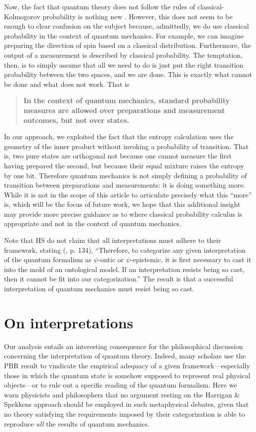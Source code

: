 \documentclass[10pt,twocolumn, nofootinbib]{revtex4-2}
\begin{document}
Now, the fact that quantum theory does not follow the rules of classical-Kolmogorov probability is nothing new \cite{Werner:2014, Pitowsky:1989}. However, this does not seem to be enough to clear confusion on the subject because, admittedly, we do use classical probability in the context of quantum mechanics. For example, we can imagine preparing the direction of spin based on a classical distribution. Furthermore, the output of a measurement is described by classical probability. The temptation, then, is to simply assume that all we need to do is just put the right transition probability between the two spaces, and we are done. This is exactly what cannot be done and what does not work. That is
\begin{quote}
	\textbf{In the context of quantum mechanics, standard probability measures are allowed over preparations and measurement outcomes, but not over states.}
\end{quote}
In our approach, we exploited the fact that the entropy calculation uses the geometry of the inner product without invoking a probability of transition. That is, two pure states are orthogonal not because one cannot measure the first having prepared the second, but because their equal mixture raises the entropy by one bit. Therefore quantum mechanics is not simply defining a probability of transition between preparations and measurements: it is doing something more. While it is not in the scope of this article to articulate precisely what this ``more'' is, which will be the focus of future work, we hope that this additional insight may provide more precise guidance as to where classical probability calculus is appropriate and not in the context of quantum mechanics.

Note that HS do not claim that all interpretations must adhere to their framework, stating (\cite{Harrigan:2010}, p. 134), ``Therefore, to categorize any given interpretation of the quantum formalism as $\psi$-ontic or $\psi$-epistemic, it is first necessary to cast it into the mold of an ontological model. If an interpretation resists being so cast, then it cannot be fit into our categorization.'' The result is that a successful interpretation of quantum mechanics must resist being so cast.

\section{On interpretations}

Our analysis entails an interesting consequence for the philosophical discussion concerning the interpretation of quantum theory. Indeed, many scholars use the PBR result to vindicate the empirical adequacy of a given framework---especially those in which the quantum state is somehow supposed to represent real physical objects---or to rule out a specific reading of the quantum formalism. Here we warn physicists and philosophers that no argument resting on the Harrigan \& Spekkens approach should be employed in such metaphysical debates, given that no theory satisfying the requirements imposed by their categorization is able to reproduce \emph{all} the results of quantum mechanics.
\end{document}
